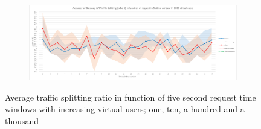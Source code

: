 \begin{figure}[H]
    \vspace{-0.1cm}

    \begin{subfigure}[b]{0.8\textwidth}
        \includegraphics[width=\textwidth]{plots/traffic-splitting/time_window_5_1000vu_cloud.png}
        \label{fig:time_window_1000vu}
    \end{subfigure}

    \vspace{-0.3cm}

    \caption{Average traffic splitting ratio in function of five second request time windows with increasing virtual users; one, ten, a hundred and a thousand}
    \label{fig:avg_vus}
\end{figure}


